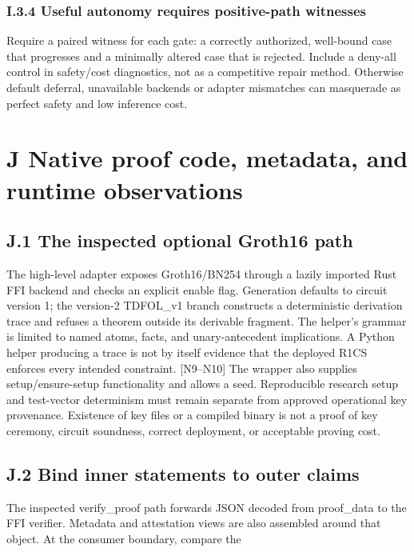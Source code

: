 \documentclass{article}
\begin{document}
\subsubsection*{I.3.4 Useful autonomy requires positive-path witnesses}
Require a paired witness for each gate: a correctly authorized, well-bound case that progresses and a
minimally altered case that is rejected. Include a deny-all control in safety/cost diagnostics, not as a
competitive repair method. Otherwise default deferral, unavailable backends or adapter mismatches
can masquerade as perfect safety and low inference cost.

\section*{J Native proof code, metadata, and runtime observations}
\subsection*{J.1 The inspected optional Groth16 path}

The high-level adapter exposes Groth16/BN254 through a lazily imported Rust FFI backend and
checks an explicit enable flag. Generation defaults to circuit version 1; the version-2 TDFOL\_v1
branch constructs a deterministic derivation trace and refuses a theorem outside its derivable fragment.
The helper’s grammar is limited to named atoms, facts, and unary-antecedent implications. A Python
helper producing a trace is not by itself evidence that the deployed R1CS enforces every intended
constraint. [N9–N10]
The wrapper also supplies setup/ensure-setup functionality and allows a seed. Reproducible research
setup and test-vector determinism must remain separate from approved operational key provenance.
Existence of key files or a compiled binary is not a proof of key ceremony, circuit soundness, correct
deployment, or acceptable proving cost.

\subsection*{J.2 Bind inner statements to outer claims}

The inspected verify\_proof path forwards JSON decoded from proof\_data to the FFI verifier. Metadata
and attestation views are also assembled around that object. At the consumer boundary, compare the
\end{document}
